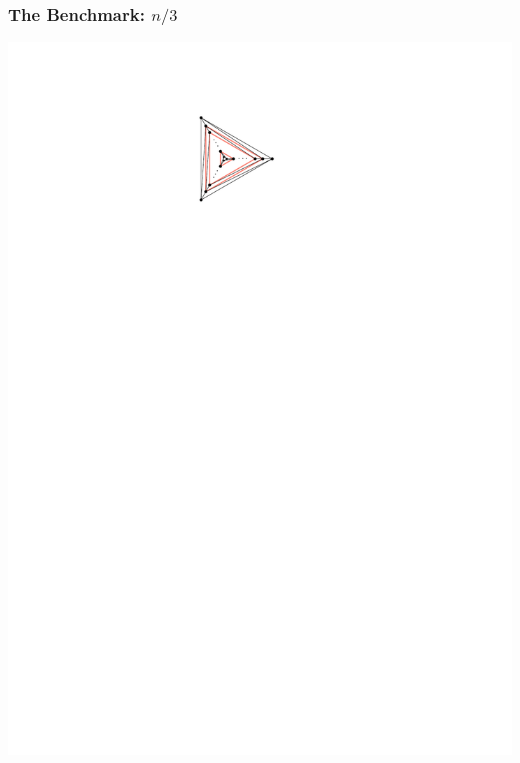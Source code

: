\documentclass{beamer}
\newcommand{\emphh}[1]{\textcolor{blue}{\emph{#1}}}
\begin{document}
\begin{frame}
  \frametitle{The Benchmark: $n/3$}

  \begin{center}
    \includegraphics[height=.7\textheight]{figs/nover3}
  \end{center}
\end{frame}


%
%
%
\end{document}
